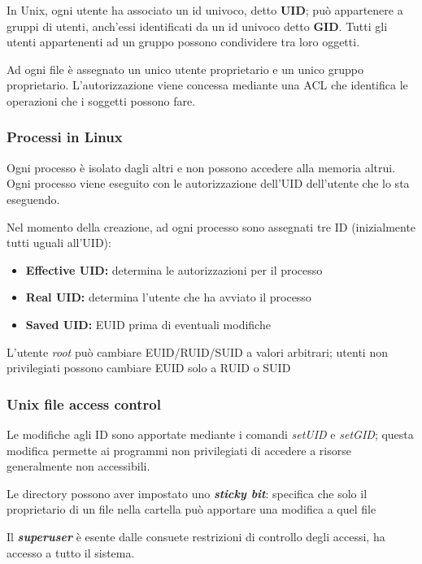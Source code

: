 \documentclass{report}
\begin{document}
\noindent In Unix, ogni utente ha associato un id univoco, detto \textbf{UID}; può appartenere a 
gruppi di utenti, anch'essi identificati da un id univoco detto \textbf{GID}. Tutti gli utenti 
appartenenti ad un gruppo possono condividere tra loro oggetti.

\noindent Ad ogni file è assegnato un unico utente proprietario e un unico gruppo proprietario. L'autorizzazione 
viene concessa mediante una ACL che identifica le operazioni che i soggetti possono fare.

\subsubsection{Processi in Linux}
Ogni processo è isolato dagli altri e non possono accedere alla memoria altrui. Ogni processo viene 
eseguito con le autorizzazione dell'UID dell'utente che lo sta eseguendo. 

\noindent Nel momento della creazione, ad ogni processo sono assegnati tre ID (inizialmente tutti uguali 
all'UID):
\begin{itemize}
    \item \textbf{Effective UID:} determina le autorizzazioni per il processo 
    \item \textbf{Real UID:} determina l'utente che ha avviato il processo 
    \item \textbf{Saved UID:} EUID prima di eventuali modifiche
\end{itemize}

\noindent L'utente \textit{root} può cambiare EUID/RUID/SUID a valori arbitrari; utenti non privilegiati
possono cambiare EUID solo a RUID o SUID

\subsubsection{Unix file access control}
Le modifiche agli ID sono apportate mediante i comandi \textit{setUID} e \textit{setGID}; questa modifica 
permette ai programmi non privilegiati di accedere a risorse generalmente non accessibili.

\noindent Le directory possono aver impostato uno \textit{\textbf{sticky bit}}: specifica che solo il proprietario di un file nella cartella
può apportare una modifica a quel file 

\noindent Il \textit{\textbf{superuser}} è esente dalle consuete restrizioni di controllo degli accessi, ha 
accesso a tutto il sistema.
\end{document}
